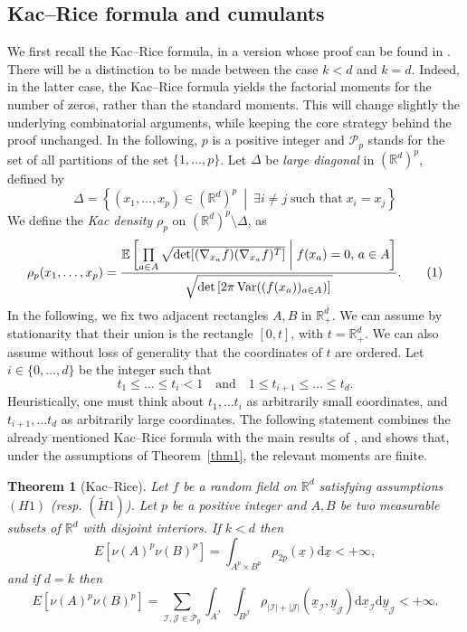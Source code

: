 \documentclass[11pt,a4paper]{article}
\newcommand{\teal}{\color{teal}}
\newcommand\J{\mathcal{J}}
\newcommand\R{\mathbb{R}}
\newcommand\x{\underline{x}}
\newcommand\y{\underline{y}}
\newcommand\E{\mathbb{E}}
\DeclareMathOperator\Var{Var}
\newcommand\dd{\mathrm{d}}
\newcommand\I{\mathcal{I}}
\newcommand\Pt{\mathcal{P}}
\newcommand{\enstq}[2]{\left\{#1~\middle|~#2\right\}}
\newcommand\numberthis{\addtocounter{equation}{1}\tag{\theequation}}
\newcommand\quand{\quad\text{and}\quad}
\numberwithin{equation}{section}
\theoremstyle{plain}
\newtheorem{theo}{Theorem}[section]
\newenvironment{theorem}%
  {\begin{mdframed}[backgroundcolor=white]\begin{theo}}%
  {\end{theo}\par\vspace{0.1cm}\end{mdframed}}
\theoremstyle{plain}
\theoremstyle{plain}
\theoremstyle{plain}
\theoremstyle{definition}
\theoremstyle{definition}
\begin{document}
\subsection{Kac--Rice formula and cumulants}
We first recall the Kac--Rice formula, in a version whose proof can be found in \cite[Thm. 6.2]{Aza09}. There will be a distinction to be made between the case $k<d$ and $k=d$. Indeed, in the latter case, the Kac--Rice formula yields the factorial moments for the number of zeros, rather than the standard moments. This will change slightly the underlying combinatorial arguments, while keeping the core strategy behind the proof unchanged. In the following, $p$ is a positive integer and $\Pt_p$ stands for the set of all partitions of the set $\{1,\ldots,p\}$. Let $\Delta$ be \textit{large diagonal} in $(\R^d)^p$, defined by
\[\Delta = \enstq{(x_1,\ldots,x_p)\in (\R^d)^p}{\exists i\neq j\;\text{such that}\; x_i=x_j}\]
We define the {\it Kac density} $\rho_p$ on $(\R^d)^p\setminus\Delta$, as
\[\rho_p(x_1,\ldots,x_p)= \dfrac{\E\left[\prod\limits_{a\in A}\sqrt{\det[(\nabla_{x_a}f)( \nabla_{x_a}f)^T]}\;\middle|\; f(x_a)=0, \, a\in A\right]}{\sqrt{\det\left[2\pi\Var((f(x_a))_{a\in A})\right]\vphantom{\int^a}}}.\numberthis\label{kac-density}\]
In the following, we fix two adjacent rectangles $A,B$ in $\R_+^d$. We can assume by stationarity that their union is the rectangle $[0,t]$, with $t = \R_+^d$. We can also assume without loss of generality that the coordinates of $t$ are ordered. Let $i\in \{0,\ldots,d\}$ be the integer such that
\[t_1\leq \ldots \leq t_i< 1\quand 1\leq t_{i+1}\leq\ldots\leq t_d.\]
Heuristically, one must think about $t_1,\ldots t_i$ as arbitrarily small coordinates, and $t_{i+1},\ldots t_d$ as arbitrarily large coordinates. The following statement combines the already mentioned Kac–Rice formula with the main results of \cite{Gas23,Anc23}, and shows that, under the assumptions of Theorem~\ref{thm1}, the relevant moments are finite.
\begin{theorem}[Kac--Rice]
\label{thm3} Let $f$ be a random field on $\R^d$ satisfying assumptions  $(H1)$ (resp. $(\widetilde{H}1)$). Let $p$ be a positive integer and $A,B$ be two measurable subsets of $\R^d$ with disjoint interiors. If $k<d$ then
\[E[\nu(A)^p\nu(B)^p] = \int_{A^p\times B^p}\rho_{2p}(\x)\dd \x <+\infty,\]
and if $d=k$ then
\[E[\nu(A)^p\nu(B)^p] = \sum_{\I,\J\in \Pt_p}\int_{A^{\I}}\int_{B^{\J}}\rho_{|\I|+|\J|}(\x_{\I},\y_{\J})\dd \x_{\I}\dd \y_{\J}<+\infty.\]
\end{theorem}

\end{document}
